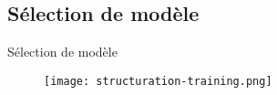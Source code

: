 \subsection{Sélection de modèle}
\begin{frame}{Sélection de modèle}
		\begin{figure}
			\texttt{[image: structuration-training.png]}
		\end{figure}
\end{frame}

